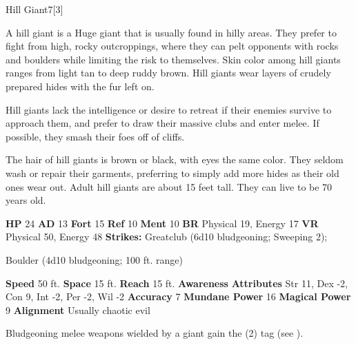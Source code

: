       
  \begin{monsubsection}{Hill Giant}{7}[3]
    \vspace{-1em}\vspace{-1em}
    \vspace{0em}

    
          A hill giant is a Huge giant that is usually found in hilly areas.
          They prefer to fight from high, rocky outcroppings, where they can pelt opponents with rocks and boulders while limiting the risk to themselves.
          Skin color among hill giants ranges from light tan to deep ruddy brown.
          Hill giants wear layers of crudely prepared hides with the fur left on.
        
          Hill giants lack the intelligence or desire to retreat if their enemies survive to approach them, and prefer to draw their massive clubs and enter melee.
          If possible, they smash their foes off of cliffs.

          The hair of hill giants is brown or black, with eyes the same color.
          They seldom wash or repair their garments, preferring to simply add more hides as their old ones wear out.
          Adult hill giants are about 15 feet tall.
          They can live to be 70 years old.
        

    \begin{spellcontent}
      \begin{spelltargetinginfo}
        \pari \textbf{HP} 24 \monsep
          \textbf{AD} 13 \monsep
          \textbf{Fort} 15 \monsep
          \textbf{Ref} 10 \monsep
          \textbf{Ment} 10
        \pari \textbf{BR} Physical 19, Energy 17 \monsep
        \textbf{VR} Physical 50, Energy 48
        \pari \textbf{Strikes:}
            Greatclub  (6d10 bludgeoning; Sweeping 2);
\par Boulder  (4d10 bludgeoning; 100 ft. range)
      \end{spelltargetinginfo}
    \end{spellcontent}
    \begin{monsterfooter}
      \pari \textbf{Speed} 50 ft. \monsep
        \textbf{Space} 15 ft. \monsep
        \textbf{Reach} 15 ft.
      \pari \textbf{Awareness} 
      \pari \textbf{Attributes}
        Str 11, Dex -2,
        Con 9, Int -2,
        Per -2, Wil -2
      \pari \textbf{Accuracy} 7 \monsep
        \textbf{Mundane Power} 16 \monsep
      \textbf{Magical Power} 9
      \pari \textbf{Alignment} Usually chaotic evil
    \end{monsterfooter}
  \end{monsubsection}
        Bludgeoning melee weapons wielded by a giant gain the  (2) tag (see ).
      
